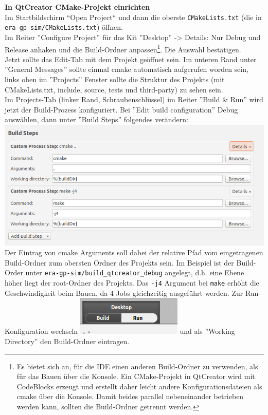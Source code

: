 \textbf{In QtCreator CMake-Projekt einrichten}\\
Im Startbildschirm ``Open Project`` und dann die oberste \texttt{CMakeLists.txt} (die in \texttt{era-gp-sim/CMakeLists.txt}) öffnen.\\
Im Reiter ''Configure Project'' für das Kit ''Desktop'' -> Details: Nur Debug und Release anhaken und die Build-Ordner anpassen\footnote{Es bietet sich an, für die IDE einen anderen Build-Ordner zu verwenden, als für das Bauen über die Konsole. Ein CMake-Projekt in QtCreator wird mit CodeBlocks erzeugt und erstellt daher leicht andere Konfigurationsdateien als cmake über die Konsole. Damit beides parallel nebeneinander betrieben werden kann, sollten die Build-Ordner getrennt werden.}. Die Auswahl bestätigen.\\
Jetzt sollte das Edit-Tab mit dem Projekt geöffnet sein. Im unteren Rand unter ''General Messages'' sollte einmal cmake automatisch aufgerufen worden sein, links oben im ''Projects'' Fenster sollte die Struktur des Projekts (mit CMakeLists.txt, include, source, tests und third-party) zu sehen sein.\\
Im Projects-Tab (linker Rand, Schraubenschlüssel) im Reiter ''Build \& Run'' wird jetzt der Build-Prozess konfiguriert.
Bei ''Edit build configuration'' Debug auswählen, dann unter ''Build Steps'' folgendes verändern:\\
\includegraphics[scale=0.5]{images/setup-qtcreator-buildrun-config.png}\\
Der Eintrag von cmake Arguments soll dabei der relative Pfad vom eingetragenen Build-Ordner zum obersten Ordner des Projekts sein. Im Beispiel ist der Build-Order unter \texttt{era-gp-sim/build\_qtcreator\_debug} angelegt, d.h. eine Ebene höher liegt der root-Ordner des Projekts. Das \texttt{-j4} Argument bei \texttt{make} erhöht die Geschwindigkeit beim Bauen, da 4 Jobs gleichzeitig ausgeführt werden.
Zur Run-Konfiguration wechseln \includegraphics[scale=1.0]{images/setup-qtcreator-run-config.png} und als ''Working Directory'' den Build-Ordner eintragen.\\


